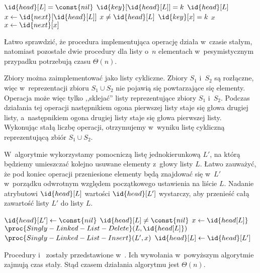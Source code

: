 \begin{codebox}
\li	\If $\id{head}[L]=\const{nil}$
\li		\Then \Return {}
		\End
\li	\If $\id{key}[\id{head}[L]]=k$
\li		\Then \Return $\id{head}[L]$
		\End
\li	$x\gets\id{next}[\id{head}[L]]$
\li	\While $x\ne\id{head}[L]$
\li		\Do
			\If $\id{key}[x]=k$
\li				\Then \Return $x$
				\End
\li			$x\gets\id{next}[x]$
		\End
\li	\Return {}
\end{codebox}

Łatwo sprawdzić, że procedura implementująca operację  działa w~czasie stałym, natomiast pozostałe dwie procedury dla listy o~$n$ elementach w~pesymistycznym przypadku potrzebują czasu $\Theta(n)$.

\exercise %
Zbiory można zaimplementować jako listy cykliczne. Zbiory $S_1$ i~$S_2$ są rozłączne, więc w~reprezentacji zbioru $S_1\cup S_2$ nie pojawią się powtarzające się elementy. Operacja  może więc tylko ,,sklejać'' listy reprezentujące zbiory $S_1$ i~$S_2$. Podczas działania tej operacji następnikiem ogona pierwszej listy staje się głowa drugiej listy, a~następnikiem ogona drugiej listy staje się głowa pierwszej listy. Wykonując stałą liczbę operacji, otrzymujemy w~wyniku listę cykliczną reprezentującą zbiór $S_1\cup S_2$.

\exercise %
W~algorytmie wykorzystamy pomocniczą listę jednokierunkową $L'$, na którą będziemy umieszczać kolejno usuwane elementy z~głowy listy $L$. Łatwo zauważyć, że pod koniec operacji przeniesione elementy będą znajdować się w~$L'$ w~porządku odwrotnym względem początkowego ustawienia na liście $L$. Nadanie atrybutowi $\id{head}[L]$ wartości $\id{head}[L']$ wystarczy, aby przenieść całą zawartość listy $L'$ do listy $L$.
\begin{codebox}
\li	$\id{head}[L']\gets\const{nil}$
\li	\While $\id{head}[L]\ne\const{nil}$
\li		\Do
			$x\gets\id{head[L]}$
\li			$\proc{Singly-Linked-List-Delete}(L,\id{head[L]})$
\li			$\proc{Singly-Linked-List-Insert}(L',x)$
		\End
\li	$\id{head}[L]\gets\id{head}[L']$
\end{codebox}

Procedury  i~ zostały przedstawione w~. Ich wywołania w~powyższym algorytmie zajmują czas stały. Stąd czasem działania algorytmu jest $\Theta(n)$.

